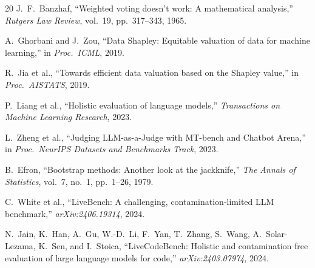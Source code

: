\documentclass[conference]{IEEEtran}
\begin{document}
\begin{thebibliography}{20}
J.~F.~Banzhaf,
``Weighted voting doesn't work: A mathematical analysis,''
\emph{Rutgers Law Review}, vol.~19, pp.~317--343, 1965.

A.~Ghorbani and J.~Zou,
``Data Shapley: Equitable valuation of data for machine learning,''
in \emph{Proc.\ ICML}, 2019.

R.~Jia et al.,
``Towards efficient data valuation based on the Shapley value,''
in \emph{Proc.\ AISTATS}, 2019.

P.~Liang et al.,
``Holistic evaluation of language models,''
\emph{Transactions on Machine Learning Research}, 2023.

L.~Zheng et al.,
``Judging LLM-as-a-Judge with MT-bench and Chatbot Arena,''
in \emph{Proc.\ NeurIPS Datasets and Benchmarks Track}, 2023.

B.~Efron,
``Bootstrap methods: Another look at the jackknife,''
\emph{The Annals of Statistics}, vol.~7, no.~1, pp.~1--26, 1979.

C.~White et al.,
``LiveBench: A challenging, contamination-limited LLM benchmark,''
\emph{arXiv:2406.19314}, 2024.

N.~Jain, K.~Han, A.~Gu, W.-D.~Li, F.~Yan, T.~Zhang, S.~Wang, A.~Solar-Lezama, K.~Sen, and I.~Stoica,
``LiveCodeBench: Holistic and contamination free evaluation of large language models for code,''
\emph{arXiv:2403.07974}, 2024.

\end{thebibliography}
\end{document}
